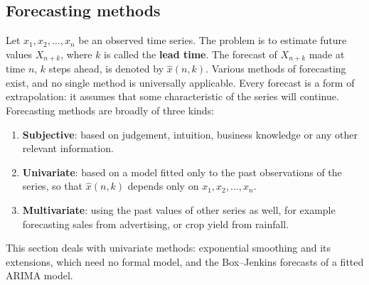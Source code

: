 \documentclass[11pt,a4paper]{article}
\theoremstyle{definition}
\begin{document}
\subsection{Forecasting methods}
Let $x_1, x_2, \dots, x_n$ be an observed time series. The problem is to estimate future values $X_{n+k}$, where $k$ is called the
\textbf{lead time}. The forecast of $X_{n+k}$ made at time $n$, $k$ steps ahead, is denoted by $\hat x(n, k)$. Various methods of
forecasting exist, and no single method is universally applicable. Every forecast is a form of extrapolation: it
assumes that some characteristic of the series will continue. Forecasting methods are broadly of three kinds:
\begin{enumerate}
\item \textbf{Subjective}: based on judgement, intuition, business knowledge or any other relevant
information.
\item \textbf{Univariate}: based on a model fitted only to the past observations of the series, so that $\hat x(n, k)$ depends
only on $x_1, x_2, \dots, x_n$.
\item \textbf{Multivariate}: using the past values of other series as well, for example forecasting sales from
advertising, or crop yield from rainfall.
\end{enumerate}
This section deals with univariate methods: exponential smoothing and its extensions, which need no
formal model, and the Box--Jenkins forecasts of a fitted ARIMA model.
\end{document}
